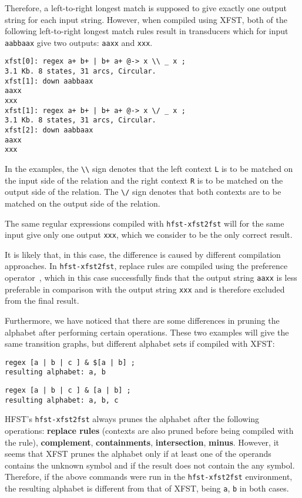 \documentclass{llncs}
\begin{document}
Therefore, a left-to-right longest match is supposed to give exactly one output
string for each input string. However, when compiled using XFST, both of the following left-to-right
longest match rules result in transducers which for input \verb+aabbaax+ give two outputs: \verb+aaxx+ and \verb+xxx+.
\begin{verbatim}
xfst[0]: regex a+ b+ | b+ a+ @-> x \\ _ x ;
3.1 Kb. 8 states, 31 arcs, Circular.
xfst[1]: down aabbaax
aaxx
xxx
xfst[1]: regex a+ b+ | b+ a+ @-> x \/ _ x ;
3.1 Kb. 8 states, 31 arcs, Circular.
xfst[2]: down aabbaax
aaxx
xxx
\end{verbatim}

In the examples, the \verb+\\+ sign denotes that the left context \verb+L+ is to be
matched on the input side of the relation and the right context \verb+R+ is to
be matched on the output side of the relation. The \verb+\/+ sign denotes
that both contexts are to be matched on the output side of the relation.

The same regular expressions compiled with \verb+hfst-xfst2fst+ will for the same
input give only one output \verb+xxx+, which we consider to be the only correct
result.

It is likely that, in this case, the difference is caused by different compilation approaches.
In \verb+hfst-xfst2fst+, replace rules are compiled using the preference
operator~\cite{drobac/2012}, which in this case successfully finds that the output string
\verb+aaxx+ is less preferable in comparison with the output string \verb+xxx+ and 
is therefore excluded from the final result.

Furthermore, we have noticed that there are some differences in pruning the alphabet
after performing certain operations.
These two examples will give the same transition graphs, but different alphabet
sets if compiled with XFST:
\begin{verbatim}
regex [a | b | c ] & $[a | b] ;
resulting alphabet: a, b
\end{verbatim}
\begin{verbatim}
regex [a | b | c ] & [a | b] ;
resulting alphabet: a, b, c
\end{verbatim}

HFST's \verb+hfst-xfst2fst+ always prunes the alphabet after the following operations:
\textbf{replace rules} (contexts are also pruned before being compiled with the
rule), \textbf{complement}, \textbf{containments}, \textbf{intersection},
\textbf{minus}. However, it seems that XFST prunes the alphabet only if at
least one of the operands contains the unknown symbol and if the result does not
contain the any symbol. Therefore, if the above commands were run in the \verb+hfst-xfst2fst+
environment, the resulting alphabet is different from that of XFST,
being \verb+a+, \verb+b+ in both cases.
\end{document}
